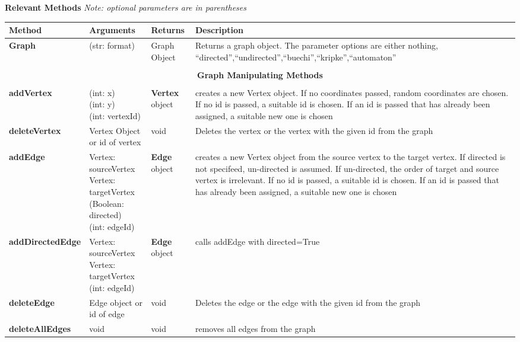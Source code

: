 \documentclass{article}
\newlength\q
\newlength\smallCol
\newlength\argsLen
\begin{document}
\textbf{{\large Relevant Methods}}
\textit{Note: optional parameters are in parentheses}

\begin{table}[h]
\begin{tabular}{m{\smallCol}m{\argsLen}m{\smallCol}m{\q}}
Method & Arguments & Returns & Description \\ \hline
\textbf{Graph}& (str: format) & Graph Object & Returns a graph object. The parameter options are either nothing, ``directed'',``undirected'',``buechi'',``kripke'',``automaton'' \\\hline
\\\multicolumn{4}{c}{\textbf{Graph Manipulating Methods}}\\\\\hline
\textbf{addVertex}  & \makecell{(int: x)\\(int: y)\\(int: vertexId)} & \textbf{Vertex} object & creates a new Vertex object. If no coordinates passed, random coordinates are chosen. If no id is passed, a suitable id is chosen. If an id is passed that has already been assigned, a suitable new one is chosen\\\hline
\textbf{deleteVertex} & Vertex Object or id of vertex & void & Deletes the vertex or the vertex with the given id from the graph\\ \hline
\textbf{addEdge} & \makecell{Vertex: sourceVertex\\Vertex: targetVertex\\(Boolean: directed) \\ (int: edgeId)} & \textbf{Edge} object & creates a new Vertex object from the source vertex to the target vertex. If directed is not specifeed, un-directed is assumed. If un-directed, the order of target and source vertex is irrelevant. If no id is passed, a suitable id is chosen. If an id is passed that has already been assigned, a suitable new one is chosen \\ \hline
\textbf{addDirectedEdge} & \makecell{Vertex: sourceVertex\\Vertex: targetVertex \\ (int: edgeId)} & \textbf{Edge} object & calls addEdge with directed=True \\ \hline
\textbf{deleteEdge} & Edge object or id of edge & void &  Deletes the edge or the edge with the given id from the graph\\ \hline
\textbf{deleteAllEdges} & void & void & removes all edges from the graph \\ \hline

\end{tabular}
\end{table}
\end{document}
